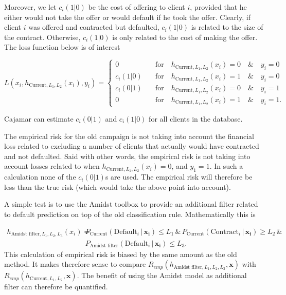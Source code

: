 \documentclass{article}
\theoremstyle{theorem}
\theoremstyle{definition}
\newcommand{\bv}[1]{\bm{#1}}
\begin{document}
{Moreover, we let $c_i(1|0)$ be the cost of offering to client $i$, provided that he either would not take the offer or would default if he took the offer.  Clearly, if client $i$ was offered and contracted but defaulted, $c_i(1|0)$ is related to the size of the contract.  Otherwise, $c_i(1|0)$ is only related to the cost of making the offer.  The loss function below is of interest

\begin{equation}
\label{def:empRiskBank}
L(x_i, h_{\mbox{Current},L_1,L_2}(x_i) , y_i) = 
\begin{cases}
0     &\quad \mbox{for} \quad h_{\mbox{Current},L_1,L_2}(x_i) = 0 \quad \& \quad y_i = 0\\
c_i(1|0)    &\quad \mbox{for} \quad h_{\mbox{Current},L_1,L_2}(x_i) = 1 \quad \& \quad y_i = 0\\
c_i(0|1)      &\quad \mbox{for} \quad h_{\mbox{Current},L_1,L_2}(x_i) = 0 \quad \& \quad y_i = 1\\
0   &\quad \mbox{for} \quad h_{\mbox{Current},L_1,L_2}(x_i) = 1 \quad \& \quad y_i = 1.
\end{cases}
\end{equation}

Cajamar can estimate $c_i(0|1)$ and $c_i(1|0)$ for all clients in the database.


The empirical risk for the old campaign is not taking into account the financial loss related to excluding a number of clients that actually would have contracted and not defaulted.  Said with other words, the empirical risk is not taking into account losses related to when $h_{\mbox{Current},L_1,L_2}(x_i) = 0$, and $y_1 = 1$.  In such a calculation none of the $c_i(0|1)$s are used.  The empirical risk will therefore be less than the true risk (which would take the above point into account).

A simple test is to use the Amidst toolbox to provide an additional filter related to default prediction on top of the old classification rule.  Mathematically this is

\begin{equation}
\begin{split}
\label{eq:filter}
h_{\mbox{Amidst filter},L_1,L_2,L_3}(x_i) = &
P_{\mbox{Current}}(\mbox{Default}_i \,|\, \bv{x_i}) \leq L_1
 \, \& \,
P_{\mbox{Current}}(\mbox{Contract}_i \,|\, \bv{x_i}) \geq L_2
\, \& \,  
\\ &
P_{\mbox{Amidst filter}}(\mbox{Default}_i \,|\, \bv{x_i}) \leq L_3.
\end{split}
\end{equation}
This calculation of empirical risk is biased by the same amount as the old method.  It makes therefore sense to compare $R_{emp}(h_{\mbox{Amidst filter},L_1,L_2,L_3}, \bv{x}) $ with $R_{emp}(h_{\mbox{Current},L_1,L_2}, \bv{x}) $.
The benefit of using the Amidst model as additional filter can therefore be quantified.

}
\end{document}
